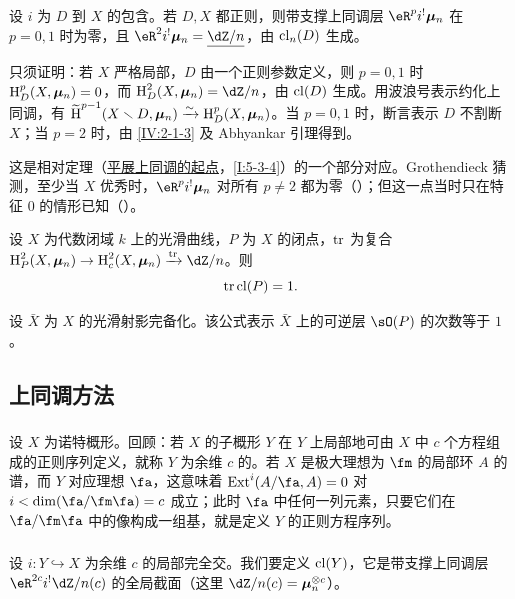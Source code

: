 \begin{proposition}\label{IV:2-1-4}
设 $i$ 为 $D$ 到 $X$ 的包含。若 $D,X$ 都正则，则带支撑上同调层 $\eR^pi^!\dmu_n$ 在 $p=0,1$ 时为零，且 $\eR^2i^!\dmu_n=\underline{\dZ/n}$，由 $\operatorname{cl}_n(D)$ 生成。
\end{proposition}
只须证明：若 $X$ 严格局部，$D$ 由一个正则参数定义，则 $p=0,1$ 时 $\operatorname{H}_D^p(X,{\bm\mu}_n)=0$，而 $\h_D^2(X,\dmu_n)=\dZ/n$，由 $\operatorname{cl}(D)$ 生成。用波浪号表示约化上同调，有 $\widetilde{\operatorname{H}}^{p-1}(X\smallsetminus D,{\bm\mu}_n)\xrightarrow\sim\operatorname{H}_D^p(X,{\bm\mu}_n)$。当 $p=0,1$ 时，断言表示 $D$ 不割断 $X$；当 $p=2$ 时，由 \ref{IV:2-1-3} 及 Abhyankar 引理得到。

这是相对定理（\hyperref[I]{平展上同调的起点}，\ref{I:5-3-4}）的一个部分对应。Grothendieck 猜测，至少当 $X$ 优秀时，$\eR^pi^!\dmu_n$ 对所有 $p\ne2$ 都为零（）；但这一点当时只在特征 $0$ 的情形已知（\cite[XIX]{sga4}）。

\begin{theorem}[基本相容性]\label{IV:2-1-5}
设 $X$ 为代数闭域 $k$ 上的光滑曲线，$P$ 为 $X$ 的闭点，$\operatorname{tr}$ 为复合
$\h_P^2(X,\dmu_n)\to\h_c^2(X,\dmu_n)\xrightarrow{\tr}\dZ/n$。则
\[
\operatorname{tr}\operatorname{cl}(P)=1.
\]
\end{theorem}
设 $\bar X$ 为 $X$ 的光滑射影完备化。该公式表示 $\bar X$ 上的可逆层 $\sO(P)$ 的次数等于 $1$。

\subsection{上同调方法}\label{IV:2-2}
\subsubsection{}\label{IV:2-2-1}
设 $X$ 为诺特概形。回顾：若 $X$ 的子概形 $Y$ 在 $Y$ 上局部地可由 $X$ 中 $c$ 个方程组成的正则序列定义，就称 $Y$ 为余维 $c$ 的。若 $X$ 是极大理想为 $\fm$ 的局部环 $A$ 的谱，而 $Y$ 对应理想 $\fa$，这意味着
$\ext^i(A/\fa,A)=0$ 对 $i<\dim(\fa/\fm\fa)=c$ 成立；此时 $\fa$ 中任何一列元素，只要它们在 $\fa/\fm\fa$ 中的像构成一组基，就是定义 $Y$ 的正则方程序列。

\subsubsection{}\label{IV:2-2-2}
设 $i:Y\hookrightarrow X$ 为余维 $c$ 的局部完全交。我们要定义 $\operatorname{cl}(Y)$，它是带支撑上同调层 $\eR^{2c}i^!\dZ/n(c)$ 的全局截面（这里 $\dZ/n(c)=\dmu_n^{\otimes c}$）。

